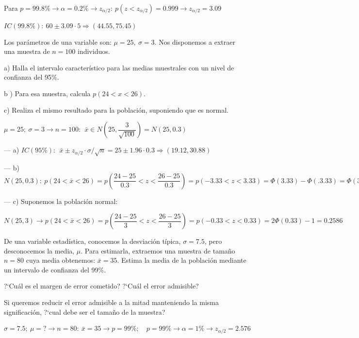 \vspace{2mm} Para $p=99.8\% \to \alpha=0.2\% \to z_{\alpha/2}:\ p(z<z_{\alpha/2})=0.999 \to z_{\alpha/2}=3.09$

\vspace{2mm} $IC(99.8\%):\ 60\pm 3.09\cdot 5 \Rightarrow (44.55,75.45)$


\vspace{4mm}
\begin{ejemplo}
\begin{ejer}
	 Los parámetros de una variable son: $\mu = 25,\  \sigma = 3$. Nos disponemos a extraer una muestra de $n = 100$ individuos.
	 
a) Halla el intervalo característico para las medias muestrales con un nivel de confianza del 95\%.

b ) Para esa muestra, calcula $p(24<x<26)$.

c) Realiza el mismo resultado para la población, suponiendo que es normal.
\end{ejer}
\end{ejemplo}
$\mu=25;\ \sigma=3 \to n=100: \ \ 	\bar x \in N \left( 25, \dfrac{3}{\sqrt{100}} \right) = N(25,0.3)$

--- a) $IC(95\%):\ \ \bar x\pm z_{\alpha/2}\cdot \sigma / \sqrt{n} =25\pm 1.96\cdot 0.3 \Rightarrow (19.12,30.88)$

--- b) $N(25,0.3):\ p(24<\bar x<26)=p\left( \dfrac{24-25}{0.3}<z<\dfrac{26-25}{0.3} \right) =p(-3.33<z<3.33)=\Phi(3.33)-\Phi(.3.33)=\Phi(3.33)-[1-\Phi(3.33)]=2\Phi(3.33)-1=2(0.99955)-1=0.9991$

--- c) Suponemos la población normal: 

$N(25,3) \to  p(24<\bar x<26)=p\left( \dfrac{24-25}{3}<z<\dfrac{26-25}{3} \right) =p(-0.33<z<0.33)=2\Phi(0.33)-1=0.2586$



\vspace{4mm}
\begin{ejemplo}
\begin{ejer}
	De una variable estadística, conocemos la desviación típica, $\sigma = 7.5$, pero desconocemos la media, $\mu$. Para estimarla, extraemos una muestra de tamaño $n = 80$ cuya media obtenemos: $\bar x = 35$. Estima la media de la población mediante un intervalo de confianza del 99\%.
	
	?`Cuál es el margen de error cometido? ?`Cuál el error admisible?
	
	Si queremos reducir el error admisible a la mitad manteniendo la misma significación, ?`cual debe ser el tamaño de la muestra?
\end{ejer}	
\end{ejemplo}
$\sigma=7.5;\ \mu=? \to n=80:\ \bar x=35 \to p=99\%; \quad p=99\% \to \alpha=1\% \to z_{\alpha/2}=2.576$

